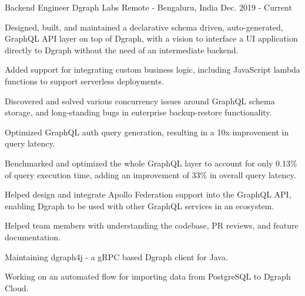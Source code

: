 

\begin{cventries}

  \cventry
    {Backend Engineer} %
    {Dgraph Labs} %
    {Remote - Bengaluru, India} %
    {Dec. 2019 - Current} %
    {
      \begin{cvitems} %
        \item {Designed, built, and maintained a declarative schema driven, auto-generated, GraphQL API layer on top of Dgraph, with a vision to interface a UI application directly to Dgraph without the need of an intermediate backend.}
	\item {Added support for integrating custom business logic, including JavaScript lambda functions to support serverless deployments.}
	\item {Discovered and solved various concurrency issues around GraphQL schema storage, and long-standing bugs in enterprise backup-restore functionality.}
	\item {Optimized GraphQL auth query generation, resulting in a 10x improvement in query latency.}
	\item {Benchmarked and optimized the whole GraphQL layer to account for only 0.13\% of query execution time, adding an improvement of 33\% in overall query latency.}
	\item {Helped design and integrate Apollo Federation support into the GraphQL API, enabling Dgraph to be used with other GraphQL services in an ecosystem.}
	\item {Helped team members with understanding the codebase, PR reviews, and feature documentation.}
	\item {Maintaining dgraph4j - a gRPC based Dgraph client for Java.}
	\item {Working on an automated flow for importing data from PostgreSQL to Dgraph Cloud.}
      \end{cvitems}
    }


\end{cventries}
